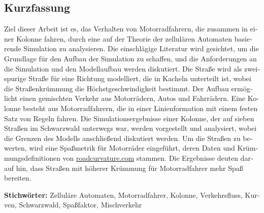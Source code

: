 \cleardoublepage

\begin{otherlanguage}{ngerman}
\chapter*{Kurzfassung}

Ziel dieser Arbeit ist es, das Verhalten von Motorradfahrern, die zusammen in einer Kolonne fahren, durch eine auf der Theorie der zellulären Automaten basierende Simulation zu analysieren. Die einschlägige Literatur wird gesichtet, um die Grundlage für den Aufbau der Simulation zu schaffen, und die Anforderungen an die Simulation und den Modellaufbau werden diskutiert. Die Straße wird als zweispurige Straße für eine Richtung modelliert, die in Kacheln unterteilt ist, wobei die Straßenkrümmung die Höchstgeschwindigkeit bestimmt. Der Aufbau ermöglicht einen gemischten Verkehr aus Motorrädern, Autos und Fahrrädern. Eine Kolonne besteht aus Motorradfahrern, die in einer Linienformation mit einem festen Satz von Regeln fahren. Die Simulationsergebnisse einer Kolonne, der auf sieben Straßen im Schwarzwald unterwegs war, werden vorgestellt und analysiert, wobei die Grenzen des Modells anschließend diskutiert werden. Um die Straßen zu bewerten, wird eine Spaßmetrik für Motorräder eingeführt, deren Daten und Krümmungsdefinitionen von \href{www.roadcurvature.com}{roadcurvature.com} stammen. Die Ergebnisse deuten darauf hin, dass Straßen mit höherer Krümmung für Motorradfahrer mehr Spaß bereiten.


\vfill
\noindent\textbf{Stichwörter:} Zelluläre Automaten, Motorradfahrer, Kolonne, Verkehrsfluss, Kurven, Schwarzwald, Spaßfaktor, Mischverkehr
\vfill
\end{otherlanguage}

